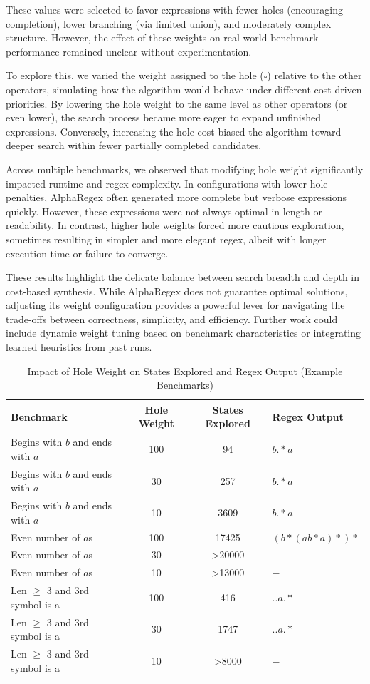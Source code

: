 \indent\indent These values were selected to favor expressions with fewer holes (encouraging completion), lower branching (via limited union), and moderately complex structure. However, the effect of these weights on real-world benchmark performance remained unclear without experimentation.

\indent\indent To explore this, we varied the weight assigned to the hole ($\square$) relative to the other operators, simulating how the algorithm would behave under different cost-driven priorities. By lowering the hole weight to the same level as other operators (or even lower), the search process became more eager to expand unfinished expressions. Conversely, increasing the hole cost biased the algorithm toward deeper search within fewer partially completed candidates.

\indent\indent Across multiple benchmarks, we observed that modifying hole weight significantly impacted runtime and regex complexity. In configurations with lower hole penalties, AlphaRegex often generated more complete but verbose expressions quickly. However, these expressions were not always optimal in length or readability. In contrast, higher hole weights forced more cautious exploration, sometimes resulting in simpler and more elegant regex, albeit with longer execution time or failure to converge.

\indent\indent These results highlight the delicate balance between search breadth and depth in cost-based synthesis. While AlphaRegex does not guarantee optimal solutions, adjusting its weight configuration provides a powerful lever for navigating the trade-offs between correctness, simplicity, and efficiency. Further work could include dynamic weight tuning based on benchmark characteristics or integrating learned heuristics from past runs.

\begin{table}[h!]
\centering
\caption{Impact of Hole Weight on States Explored and Regex Output (Example Benchmarks)}
\label{tab:alpha_regex_weight_analysis}
\begin{tabular}{|l|c|c|l|}
\hline
\textbf{Benchmark} & \textbf{Hole Weight} & \textbf{States Explored} & \textbf{Regex Output} \\
\hline
Begins with $b$ and ends with $a$ & 100 & 94 & $b.*a$ \\
Begins with $b$ and ends with $a$ & 30 & 257 & $b.*a$ \\
Begins with $b$ and ends with $a$ & 10 & 3609 & $b.*a$ \\
\hline
Even number of $a$s & 100 & 17425 & $(b*(ab*a)*)*$ \\
Even number of $a$s & 30 & >20000 & $-$ \\
Even number of $a$s & 10 & >13000 & $-$ \\
\hline
Len $\ge$ 3 and 3rd symbol is a & 100 & 416 & $..a.*$ \\
Len $\ge$ 3 and 3rd symbol is a & 30 & 1747 & $..a.*$ \\
Len $\ge$ 3 and 3rd symbol is a & 10 & >8000 & $-$ \\
\hline
\end{tabular}
\end{table}

